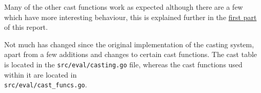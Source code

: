 Many of the other cast functions work as expected although there are a few which have more interesting behaviour, this is explained further in the \hyperref[sec:hello-sttp-casting]{first part} of this report.





Not much has changed since the original implementation of the casting system, apart from a few additions and changes to certain cast functions. The cast table is located in the \verb|src/eval/casting.go| file, whereas the cast functions used within it are located in \\\verb|src/eval/cast_funcs.go|.
